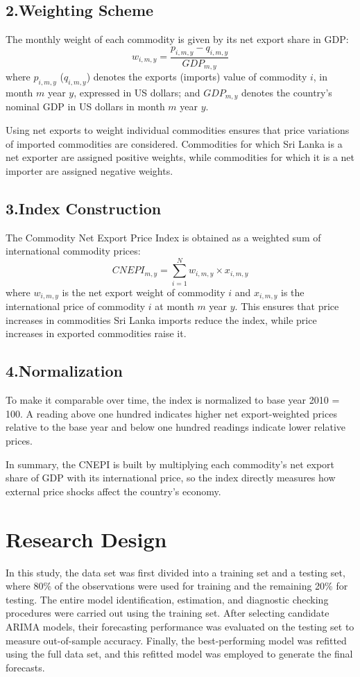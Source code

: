 \documentclass[12pt,a4paper]{report} %
\begin{document}
\subsection*{2.Weighting Scheme}
The monthly weight of each commodity is given by its net export share in GDP:
\[
w_{i,m,y} = \frac{p_{i,m,y} - q_{i,m,y}}{GDP_{m,y}}
\]
where $p_{i,m,y}$ ($q_{i,m,y}$) denotes the exports (imports) value of commodity $i$, in month $m$ year $y$, expressed in US dollars; and $GDP_{m,y}$ denotes the country's nominal GDP in US dollars in month $m$ year $y$.

Using net exports to weight individual commodities ensures that price variations of imported commodities are considered. Commodities for which Sri Lanka is a net exporter are assigned positive weights, while commodities for which it is a net importer are assigned negative weights.

\subsection*{3.Index Construction}
The Commodity Net Export Price Index is obtained as a weighted sum of international commodity prices:
\[
CNEPI_{m,y} = \sum_{i=1}^{N} w_{i,m,y} \times x_{i,m,y}
\]
where $w_{i,m,y}$ is the net export weight of commodity $i$ and $x_{i,m,y}$ is the international price of commodity $i$ at month $m$ year $y$. This ensures that price increases in commodities Sri Lanka imports reduce the index, while price increases in exported commodities raise it.

\subsection*{4.Normalization}
To make it comparable over time, the index is normalized to base year 2010 = 100. A reading above one hundred indicates higher net export-weighted prices relative to the base year and below one hundred readings indicate lower relative prices.


In summary, the CNEPI is built by multiplying each commodity’s net export share of GDP with its international price, so the index directly measures how external price shocks affect the country’s economy.

\section{Research Design}
In this study, the data set was first divided into a training set and a testing set, where 80\% of the observations were used for training and the remaining 20\% for testing. The entire model identification, estimation, and diagnostic checking procedures were carried out using the training set. After selecting candidate ARIMA models, their forecasting performance was evaluated on the testing set to measure out-of-sample accuracy. Finally, the best-performing model was refitted using the full data set, and this refitted model was employed to generate the final forecasts.
\end{document}
